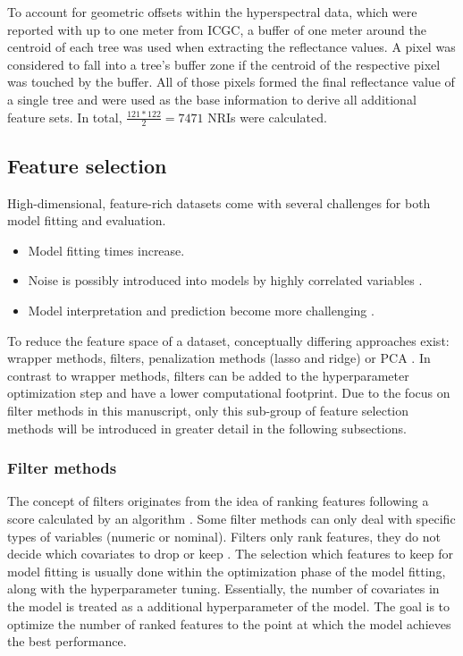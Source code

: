 \documentclass[journal]{IEEEtran}
\begin{document}
To account for geometric offsets within the hyperspectral data, which were reported with up to one meter from \ac{ICGC}, a buffer of one meter around the centroid of each tree was used when extracting the reflectance values.
A pixel was considered to fall into a tree's buffer zone if the centroid of the respective pixel was touched by the buffer.
All of those pixels formed the final reflectance value of a single tree and were used as the base information to derive all additional feature sets.
In total, \(\frac{121*122}{2} = 7471\) NRIs were calculated.

\subsection{Feature selection}

High-dimensional, feature-rich datasets come with several challenges for both model fitting and evaluation.

\begin{itemize}
	\item Model fitting times increase.
	\item Noise is possibly introduced into models by highly correlated variables \cite{johnstoneiainm.2009}.
	\item Model interpretation and prediction become more challenging \cite{johnstoneiainm.2009}.
\end{itemize}

To reduce the feature space of a dataset, conceptually differing approaches exist: wrapper methods, filters, penalization methods (lasso and ridge) or \ac{PCA} \cite{bommert2020, das2001, guyon2003, jolliffe2016}.
In contrast to wrapper methods, filters can be added to the hyperparameter optimization step and have a lower computational footprint.
Due to the focus on filter methods in this manuscript, only this sub-group of feature selection methods will be introduced in greater detail in the following subsections.

\subsubsection{Filter methods}

The concept of filters originates from the idea of ranking features following a score calculated by an algorithm \cite{guyon2003}.
Some filter methods can only deal with specific types of variables (numeric or nominal).
Filters only rank features, they do not decide which covariates to drop or keep \cite{drotar2015}.
The selection which features to keep for model fitting is usually done within the optimization phase of the model fitting, along with the hyperparameter tuning.
Essentially, the number of covariates in the model is treated as a additional hyperparameter of the model.
The goal is to optimize the number of ranked features to the point at which the model achieves the best performance.
\end{document}
